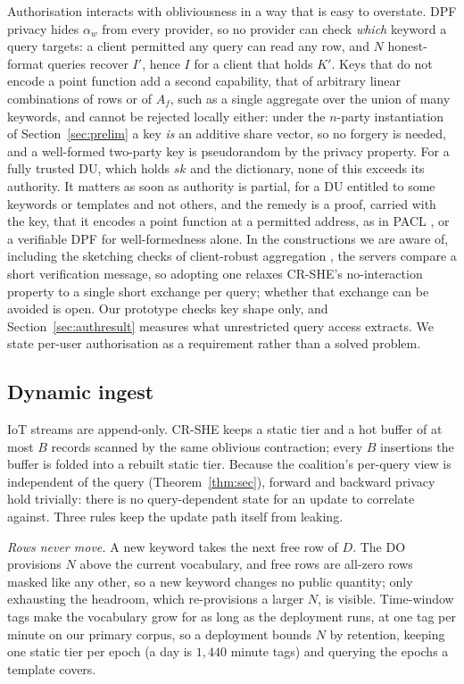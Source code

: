 \documentclass[a4paper,fleqn]{cas-dc}
\begin{document}
Authorisation interacts with obliviousness in a way that is easy to overstate.
DPF privacy hides $\alpha_w$ from every provider, so no provider can check
\emph{which} keyword a query targets: a client permitted any query can read
any row, and $N$ honest-format queries recover $I'$, hence $I$ for a client
that holds $K'$. Keys that do not encode a point function add a second
capability, that of arbitrary linear combinations of rows or of $A_f$, such as
a single aggregate over the union of many keywords, and cannot be rejected
locally either: under the $n$-party instantiation of Section~\ref{sec:prelim}
a key \emph{is} an additive share vector, so no forgery is needed, and a
well-formed two-party key is pseudorandom by the privacy property. For a fully
trusted DU, which holds $sk$ and the dictionary, none of this exceeds its
authority. It matters as soon as authority is partial, for a DU entitled to
some keywords or templates and not others, and the remedy is a proof, carried
with the key, that it encodes a point function at a permitted address, as in
PACL \citep{pacl}, or a verifiable DPF \citep{decastro2022lightweight} for
well-formedness alone. In the constructions we are aware of, including the
sketching checks of client-robust aggregation \citep{boneh2021lightweight},
the servers compare a short verification message, so adopting one relaxes
CR-SHE's no-interaction property to a single short exchange per query; whether
that exchange can be avoided is open. Our prototype checks key shape only, and
Section~\ref{sec:authresult} measures what unrestricted query access extracts.
We state per-user authorisation as a requirement rather than a solved problem.

\subsection{Dynamic ingest}
\label{sec:ingest}
IoT streams are append-only. CR-SHE keeps a static tier and a hot buffer of at
most $B$ records scanned by the same oblivious contraction; every $B$
insertions the buffer is folded into a rebuilt static tier. Because the
coalition's per-query view is independent of the query
(Theorem~\ref{thm:sec}), forward and backward privacy hold trivially: there is
no query-dependent state for an update to correlate against. Three rules keep
the update path itself from leaking.

\emph{Rows never move.} A new keyword takes the next free row of $D$. The DO
provisions $N$ above the current vocabulary, and free rows are all-zero rows
masked like any other, so a new keyword changes no public quantity; only
exhausting the headroom, which re-provisions a larger $N$, is visible.
Time-window tags make the vocabulary grow for as long as the deployment runs,
at one tag per minute on our primary corpus, so a deployment bounds $N$ by
retention, keeping one static tier per epoch (a day is $1{,}440$ minute tags)
and querying the epochs a template covers.
\end{document}

